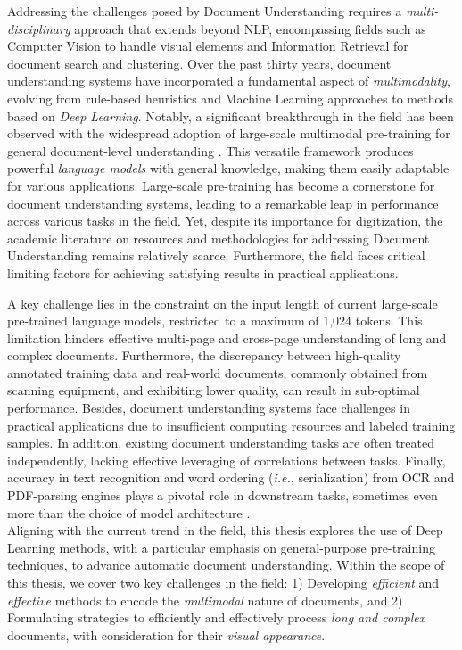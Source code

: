 Addressing the challenges posed by Document Understanding requires a \textit{multi-disciplinary} approach that extends beyond \ac{NLP}, encompassing fields such as Computer Vision to handle visual elements and Information Retrieval for document search and clustering. Over the past thirty years, document understanding systems have incorporated a fundamental aspect of \textit{multimodality}, evolving from rule-based heuristics and Machine Learning approaches to methods based on \textit{Deep Learning}. Notably, a significant breakthrough in the field has been observed with the widespread adoption of large-scale multimodal pre-training for general document-level understanding \citep{xu2020layoutlm}. This versatile framework produces powerful \textit{language models} with general knowledge, making them easily adaptable for various applications. Large-scale pre-training has become a cornerstone for document understanding systems, leading to a remarkable leap in performance across various tasks in the field. Yet, despite its importance for digitization, the academic literature on resources and methodologies for addressing Document Understanding remains relatively scarce. Furthermore, the field faces critical limiting factors for achieving satisfying results in practical applications. 

A key challenge lies in the constraint on the input length of current large-scale pre-trained language models, restricted to a maximum of 1,024 tokens. This limitation hinders effective multi-page and cross-page understanding of long and complex documents. Furthermore, the discrepancy between high-quality annotated training data and real-world documents, commonly obtained from scanning equipment, and exhibiting lower quality, can result in sub-optimal performance. Besides, document understanding systems face challenges in practical applications due to insufficient computing resources and labeled training samples. In addition, existing document understanding tasks are often treated independently, lacking effective leveraging of correlations between tasks. Finally, accuracy in text recognition and word ordering (\textit{i.e.}, serialization) from \ac{OCR} and PDF-parsing engines plays a pivotal role in downstream tasks, sometimes even more than the choice of model architecture \citep{borchmann2021due}. \\

Aligning with the current trend in the field, this thesis explores the use of Deep Learning methods, with a particular emphasis on general-purpose pre-training techniques, to advance automatic document understanding. Within the scope of this thesis, we cover two key challenges in the field: 1) Developing \textit{efficient} and \textit{effective} methods to encode the \textit{multimodal} nature of documents, and 2) Formulating strategies to efficiently and effectively process \textit{long and complex} documents, with consideration for their \textit{visual appearance}.

